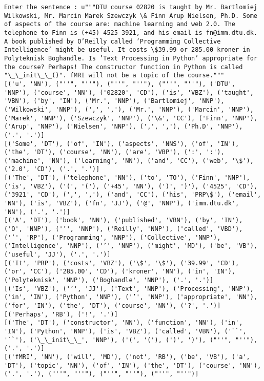 \documentclass[11pt]{article}
\begin{document}
    \begin{Verbatim}[commandchars=\\\{\}]
Enter the sentence : u"""DTU course 02820 is taught by Mr. Bartlomiej Wilkowski, Mr. Marcin Marek Szewczyk \& Finn Arup Nielsen, Ph.D. Some of aspects of the course are: machine learning and web 2.0. The telephone to Finn is (+45) 4525 3921, and his email is fn@imm.dtu.dk. A book published by O’Reilly called ’Programming Collective Intelligence’ might be useful. It costs \$39.99 or 285.00 kroner in Polyteknisk Boghandle. Is ’Text Processing in Python’ appropriate for the course? Perhaps! The constructor function in Python is called "\_\_init\_\_()". fMRI will not be a topic of the course."""
[('u', 'NN'), ("''", "''"), ("''", "''"), ("''", "''"), ('DTU', 'NNP'), ('course', 'NN'), ('02820', 'CD'), ('is', 'VBZ'), ('taught', 'VBN'), ('by', 'IN'), ('Mr.', 'NNP'), ('Bartlomiej', 'NNP'), ('Wilkowski', 'NNP'), (',', ','), ('Mr.', 'NNP'), ('Marcin', 'NNP'), ('Marek', 'NNP'), ('Szewczyk', 'NNP'), ('\&', 'CC'), ('Finn', 'NNP'), ('Arup', 'NNP'), ('Nielsen', 'NNP'), (',', ','), ('Ph.D', 'NNP'), ('.', '.')]
[('Some', 'DT'), ('of', 'IN'), ('aspects', 'NNS'), ('of', 'IN'), ('the', 'DT'), ('course', 'NN'), ('are', 'VBP'), (':', ':'), ('machine', 'NN'), ('learning', 'NN'), ('and', 'CC'), ('web', '\$'), ('2.0', 'CD'), ('.', '.')]
[('The', 'DT'), ('telephone', 'NN'), ('to', 'TO'), ('Finn', 'NNP'), ('is', 'VBZ'), ('(', '('), ('+45', 'NN'), (')', ')'), ('4525', 'CD'), ('3921', 'CD'), (',', ','), ('and', 'CC'), ('his', 'PRP\$'), ('email', 'NN'), ('is', 'VBZ'), ('fn', 'JJ'), ('@', 'NNP'), ('imm.dtu.dk', 'NN'), ('.', '.')]
[('A', 'DT'), ('book', 'NN'), ('published', 'VBN'), ('by', 'IN'), ('O', 'NNP'), ('’', 'NNP'), ('Reilly', 'NNP'), ('called', 'VBD'), ('’', 'RP'), ('Programming', 'NNP'), ('Collective', 'NNP'), ('Intelligence', 'NNP'), ('’', 'NNP'), ('might', 'MD'), ('be', 'VB'), ('useful', 'JJ'), ('.', '.')]
[('It', 'PRP'), ('costs', 'VBZ'), ('\$', '\$'), ('39.99', 'CD'), ('or', 'CC'), ('285.00', 'CD'), ('kroner', 'NN'), ('in', 'IN'), ('Polyteknisk', 'NNP'), ('Boghandle', 'NNP'), ('.', '.')]
[('Is', 'VBZ'), ('’', 'JJ'), ('Text', 'NNP'), ('Processing', 'NNP'), ('in', 'IN'), ('Python', 'NNP'), ('’', 'NNP'), ('appropriate', 'NN'), ('for', 'IN'), ('the', 'DT'), ('course', 'NN'), ('?', '.')]
[('Perhaps', 'RB'), ('!', '.')]
[('The', 'DT'), ('constructor', 'NN'), ('function', 'NN'), ('in', 'IN'), ('Python', 'NNP'), ('is', 'VBZ'), ('called', 'VBN'), ('``', '``'), ('\_\_init\_\_', 'NNP'), ('(', '('), (')', ')'), ("''", "''"), ('.', '.')]
[('fMRI', 'NN'), ('will', 'MD'), ('not', 'RB'), ('be', 'VB'), ('a', 'DT'), ('topic', 'NN'), ('of', 'IN'), ('the', 'DT'), ('course', 'NN'), ('.', '.'), ("''", "''"), ("''", "''"), ("''", "''")]

    \end{Verbatim}
\end{document}

